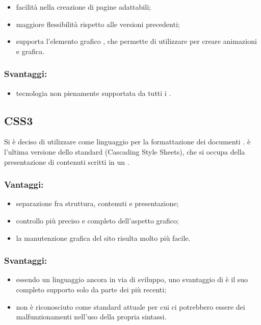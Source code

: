 \documentclass[a4paper, titlepage]{article}
\begin{document}
\begin{itemize}
	\item facilità nella creazione di pagine adattabili;
	\item maggiore flessibilità rispetto alle versioni precedenti;
	\item supporta l'elemento grafico , che permette di utilizzare  per creare animazioni e grafica.
\end{itemize}

\subsubsection{Svantaggi:}

\begin{itemize}
	\item tecnologia non pienamente supportata da tutti i .
\end{itemize}

\subsection{CSS3}
Si è deciso di utilizzare  come linguaggio per la formattazione dei documenti .  è l'ultima versione dello standard  (Cascading Style Sheets), che si occupa della presentazione di contenuti scritti in un .

\subsubsection{Vantaggi:}
\begin{itemize}
	\item separazione fra struttura, contenuti e presentazione;
	\item controllo più preciso e completo dell'aspetto grafico;
	\item la manutenzione grafica del sito risulta molto più facile.
\end{itemize}

\subsubsection{Svantaggi:}
\begin{itemize}
	\item essendo un linguaggio ancora in via di sviluppo, uno svantaggio di  è il suo completo supporto solo da parte dei   più recenti;
	\item non è riconosciuto come standard attuale per cui ci potrebbero essere dei malfunzionamenti nell'uso della propria sintassi. 
\end{itemize}
\end{document}
